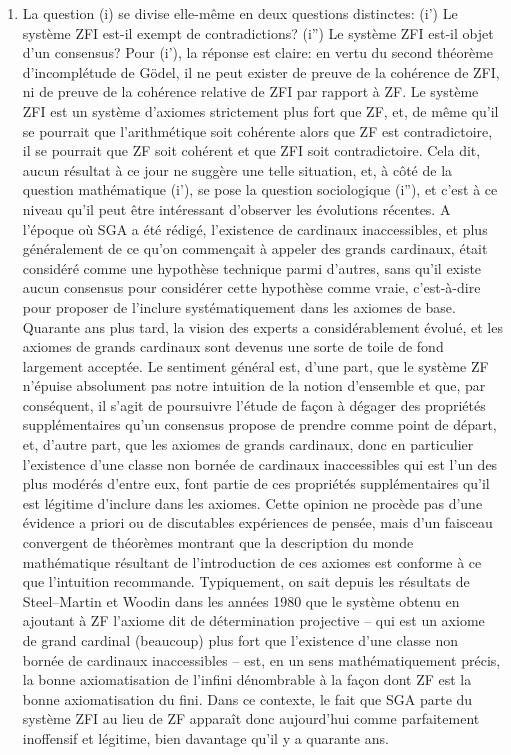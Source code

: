 \documentclass[10pt]{fichiers-configuration-latex/smfart}
\begin{document}
\begin{enumerate}
\item La question (i) se divise elle-même en deux questions
distinctes: (i') Le système ZFI est-il exempt de
contradictions? (i'') Le système ZFI est-il objet d'un
consensus? Pour (i'), la réponse est claire: en vertu du
second théorème d'incomplétude de Gödel, il ne peut exister
de preuve de la cohérence de ZFI, ni de preuve de la
cohérence relative de ZFI par rapport à ZF. Le système ZFI
est un système d'axiomes strictement plus fort que ZF, et,
de même qu'il se pourrait que l'arithmétique soit cohérente
alors que ZF est contradictoire, il se pourrait que ZF soit
cohérent et que ZFI soit contradictoire. Cela dit, aucun
résultat à ce jour ne suggère une telle situation, et, à
côté de la question mathématique (i'), se pose la question
sociologique (i''), et c'est à ce niveau qu'il peut être
intéressant d'observer les évolutions récentes. A l'époque
où SGA a été rédigé, l'existence de cardinaux inaccessibles,
et plus généralement de ce qu'on commençait à appeler des
grands cardinaux, était considéré comme une hypothèse
technique parmi d'autres, sans qu'il existe aucun consensus
pour considérer cette hypothèse comme vraie, c'est-à-dire
pour proposer de l'inclure systématiquement dans les axiomes
de base. Quarante ans plus tard, la vision des experts a
considérablement évolué, et les axiomes de grands cardinaux
sont devenus une sorte de toile de fond largement acceptée.
Le sentiment général est, d'une part, que le système ZF
n'épuise absolument pas notre intuition de la notion
d'ensemble et que, par conséquent, il s'agit de poursuivre
l'étude de façon à dégager des propriétés supplémentaires
qu'un consensus propose de prendre comme point de départ,
et, d'autre part, que les axiomes de grands cardinaux, donc
en particulier l'existence d'une classe non bornée de
cardinaux inaccessibles qui est l'un des plus modérés
d'entre eux, font partie de ces propriétés supplémentaires
qu'il est légitime d'inclure dans les axiomes. Cette opinion
ne procède pas d'une évidence a priori ou de discutables
expériences de pensée, mais d'un faisceau convergent de
théorèmes montrant que la description du monde mathématique
résultant de l'introduction de ces axiomes est conforme à ce
que l'intuition recommande. Typiquement, on sait depuis les
résultats de Steel--Martin et Woodin dans les années 1980
que le système obtenu en ajoutant à ZF l'axiome dit de
détermination projective -- qui est un axiome de grand
cardinal (beaucoup) plus fort que l'existence d'une classe
non bornée de cardinaux inaccessibles -- est, en un sens
mathématiquement précis, la bonne axiomatisation de l'infini
dénombrable à la façon dont ZF est la bonne axiomatisation
du fini. Dans ce contexte, le fait que SGA parte du système
ZFI au lieu de ZF apparaît donc aujourd'hui comme
parfaitement inoffensif et légitime, bien davantage qu'il y
a quarante ans.


\end{enumerate}
\end{document}
